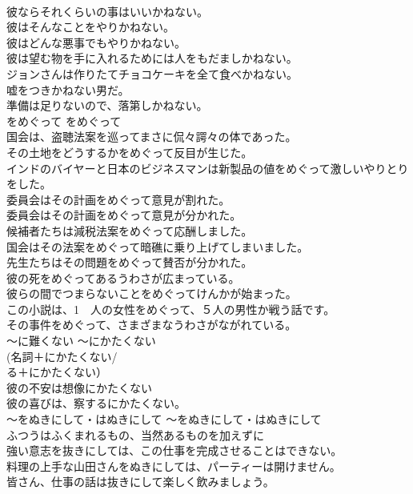 \documentclass[8pt]{extreport}
\begin{document}
\begin{CJK}{UTF8}{min}
\\	彼ならそれくらいの事はいいかねない。   
\\	彼はそんなことをやりかねない。   
\\	彼はどんな悪事でもやりかねない。   
\\	彼は望む物を手に入れるためには人をもだましかねない。   
\\	ジョンさんは作りたてチョコケーキを全て食べかねない。  
\\	嘘をつきかねない男だ。　  
\\	準備は足りないので、落第しかねない。  
\\	をめぐって	をめぐって	
\\	国会は、盗聴法案を巡ってまさに侃々諤々の体であった。  
\\	その土地をどうするかをめぐって反目が生じた。   
\\	インドのバイヤーと日本のビジネスマンは新製品の値をめぐって激しいやりとりをした。   
\\	委員会はその計画をめぐって意見が割れた。   
\\	委員会はその計画をめぐって意見が分かれた。   
\\	候補者たちは減税法案をめぐって応酬しました。   
\\	国会はその法案をめぐって暗礁に乗り上げてしまいました。   
\\	先生たちはその問題をめぐって賛否が分かれた。   
\\	彼の死をめぐってあるうわさが広まっている。   
\\	彼らの間でつまらないことをめぐってけんかが始まった。   
\\	この小説は、1　人の女性をめぐって、５人の男性か戦う話です。  
\\	その事件をめぐって、さまざまなうわさがながれている。  
\\	〜に難くない	〜にかたくない	
\\	(名詞＋にかたくない/　
\\	る＋にかたくない）	
\\	彼の不安は想像にかたくない  
\\	彼の喜びは、察するにかたくない。  
\\	〜をぬきにして・はぬきにして	〜をぬきにして・はぬきにして	
\\	ふつうはふくまれるもの、当然あるものを加えずに	
\\	強い意志を抜きにしては、この仕事を完成させることはできない。  
\\	料理の上手な山田さんをぬきにしては、パーティーは開けません。  
\\	皆さん、仕事の話は抜きにして楽しく飲みましょう。  

\end{CJK}
\end{document}
